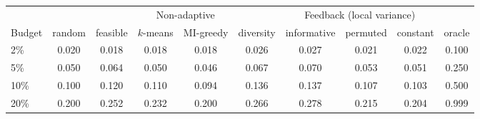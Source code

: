 \begin{tabular}{lccccccccc}
\toprule
 & & \multicolumn{4}{c}{Non-adaptive} & \multicolumn{3}{c}{Feedback (local variance)} & \\
\cmidrule(lr){3-6}\cmidrule(lr){7-9}
Budget & random & feasible & $k$-means & MI-greedy & diversity & informative & permuted & constant & oracle \\
\midrule
2\% & 0.020 & 0.018 & 0.018 & 0.018 & 0.026 & 0.027 & 0.021 & 0.022 & 0.100 \\
5\% & 0.050 & 0.064 & 0.050 & 0.046 & 0.067 & 0.070 & 0.053 & 0.051 & 0.250 \\
10\% & 0.100 & 0.120 & 0.110 & 0.094 & 0.136 & 0.137 & 0.107 & 0.103 & 0.500 \\
20\% & 0.200 & 0.252 & 0.232 & 0.200 & 0.266 & 0.278 & 0.215 & 0.204 & 0.999 \\
\bottomrule
\end{tabular}